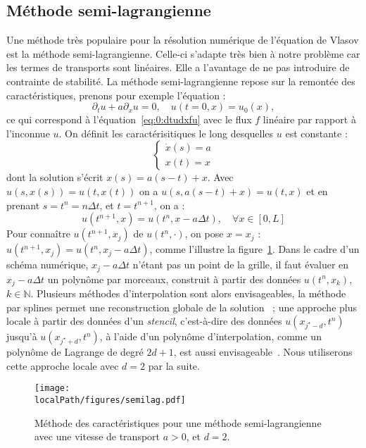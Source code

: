 \subsection{Méthode semi-lagrangienne}

Une méthode très populaire pour la résolution numérique de l'équation de Vlasov est la méthode semi-lagrangienne. Celle-ci s'adapte très bien à notre problème car les termes de transports sont linéaires. Elle a l'avantage de ne pas introduire de contrainte de stabilité. La méthode semi-lagrangienne repose sur la remontée des caractéristiques, prenons pour exemple l'équation :
$$
  \partial_t u + a\partial_xu = 0,\quad u(t=0,x)=u_0(x),
$$
ce qui correspond à l'équation~\ref{eq:0:dtudxfu} avec le flux $f$ linéaire par rapport à l'inconnue $u$. On définit les caractérisitiques le long desquelles $u$ est constante :
$$
  \begin{cases}
    \dot{x}(s) = a \\
    x(t) = x
  \end{cases}
$$
dont la solution s'écrit $x(s) = a(s-t)+x$. Avec $u(s,x(s))=u(t,x(t))$ on a $u(s,a(s-t)+x) = u(t,x)$ et en prenant $s=t^n=n\Delta t$, et $t=t^{n+1}$, on a :
$$
  u(t^{n+1},x) = u(t^n,x-a\Delta t),\quad \forall x\in[0,L]
$$
Pour connaître $u(t^{n+1},x_j)$ de $u(t^n,\cdot)$, on pose $x=x_j$ : $u(t^{n+1},x_j) = u(t^n,x_j-a\Delta t)$, comme l'illustre la figure~\ref{fig:intro:semilag}. Dans le cadre d'un schéma numérique, $x_j-a\Delta t$ n'étant pas un point de la grille, il faut évaluer en $x_j-a\Delta t$ un polynôme par morceaux, construit à partir des données $u(t^n,x_k)$, $k\in\mathbb{N}$. Plusieurs méthodes d'interpolation sont alors envisageables, la méthode par splines permet une reconstruction globale de la solution~\cite{Cheng:1976,Sonnendrucker:2015} ; une approche plus locale à partir des données d'un \emph{stencil}, c'est-à-dire des données $u(x_{j^\star-d},t^n)$ jusqu'à $u(x_{j^\star+d},t^n)$, à l'aide d'un polynôme d'interpolation, comme un polynôme de Lagrange de degré $2d+1$, est aussi envisageable~\cite{Charles:2013}. Nous utiliserons cette approche locale avec $d=2$ par la suite.

\begin{figure}[h]
  \centering
  \texttt{[image: \\localPath/figures/semilag.pdf]}
  \caption{Méthode des caractéristiques pour une méthode semi-lagrangienne avec une vitesse de transport $a>0$, et $d=2$.}
  \label{fig:intro:semilag}
\end{figure}


